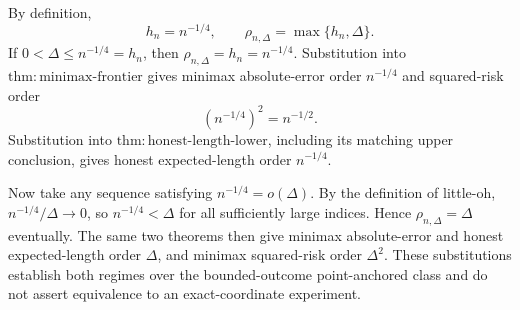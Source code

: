 By definition,
\[
 h_n=n^{-1/4},
 \qquad
 \rho_{n,\Delta}=\max\{h_n,\Delta\}.
\]
If \(0<\Delta\leq n^{-1/4}=h_n\), then \(\rho_{n,\Delta}=h_n=n^{-1/4}\).  Substitution into \(\mathrm{thm:minimax\text{-}frontier}\) gives minimax absolute-error order \(n^{-1/4}\) and squared-risk order
\[
 (n^{-1/4})^2=n^{-1/2}.
\]
Substitution into \(\mathrm{thm:honest\text{-}length\text{-}lower}\), including its matching upper conclusion, gives honest expected-length order \(n^{-1/4}\).

Now take any sequence satisfying \(n^{-1/4}=o(\Delta)\).  By the definition of little-oh, \(n^{-1/4}/\Delta\to0\), so \(n^{-1/4}<\Delta\) for all sufficiently large indices.  Hence \(\rho_{n,\Delta}=\Delta\) eventually.  The same two theorems then give minimax absolute-error and honest expected-length order \(\Delta\), and minimax squared-risk order \(\Delta^2\).  These substitutions establish both regimes over the bounded-outcome point-anchored class and do not assert equivalence to an exact-coordinate experiment.